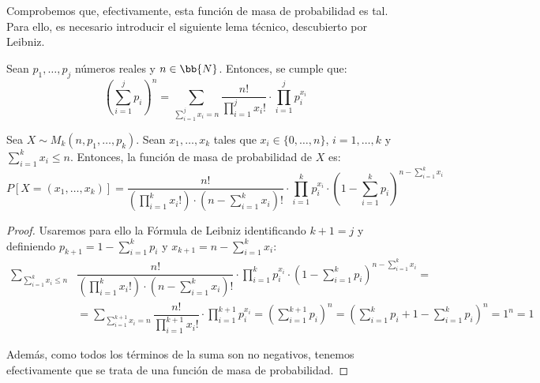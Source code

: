 Comprobemos que, efectivamente, esta función de masa de probabilidad es tal.
Para ello, es necesario introducir el siguiente lema técnico, descubierto por Leibniz.
\begin{lema}
    Sean $p_1, \ldots, p_j$ números reales y $n\in \bb{N}$. Entonces, se cumple que:
    \begin{equation*}
        \left(\sum_{i=1}^j p_i\right)^n=\sum_{\sum\limits_{i=1}^j x_i=n}\dfrac{n!}{\prod\limits_{i=1}^j x_i!}\cdot \prod_{i=1}^j p_i^{x_i}
    \end{equation*}
\end{lema}
\begin{prop}
    Sea $X\sim M_k(n, p_1, \ldots, p_k)$. Sean $x_1, \ldots, x_k$ tales que $x_i\in \{0,\dots,n\}$, $i=1, \ldots, k$ y $\sum\limits_{i=1}^k x_i\leq n$. Entonces, la función de masa de probabilidad de $X$ es:
    \begin{equation*}
        P[X=(x_1,\dots,x_k)]=\dfrac{n!}{\left(\prod\limits_{i=1}^k x_i!\right)\cdot \left(n-\sum\limits_{i=1}^k x_i\right)!}\cdot \prod_{i=1}^{k} p_i^{x_i} \cdot \left(1-\sum\limits_{i=1}^k p_i\right)^{n-\sum\limits_{i=1}^k x_i}
    \end{equation*}
\end{prop}
\begin{proof}
    Usaremos para ello la Fórmula de Leibniz identificando $k+1=j$ y definiendo $p_{k+1}=1-\sum\limits_{i=1}^k p_i$ y $x_{k+1}=n-\sum\limits_{i=1}^k x_i$:
    \begin{align*}
        \sum_{\sum\limits_{i=1}^k x_i\leq n} &\dfrac{n!}{\left(\prod\limits_{i=1}^k x_i!\right)\cdot \left(n-\sum\limits_{i=1}^k x_i\right)!}\cdot \prod_{i=1}^{k} p_i^{x_i} \cdot \left(1-\sum\limits_{i=1}^k p_i\right)^{n-\sum\limits_{i=1}^k x_i}
        =\\&=
        \sum_{\sum\limits_{i=1}^{k+1} x_i=n}\dfrac{n!}{\prod\limits_{i=1}^{k+1} x_i!}\cdot \prod_{i=1}^{k+1} p_i^{x_i}
        = \left(\sum_{i=1}^{k+1} p_i\right)^n = \left(\sum_{i=1}^{k} p_i+1-\sum_{i=1}^{k} p_i\right)^n=1^n=1
    \end{align*}

    Además, como todos los términos de la suma son no negativos, tenemos efectivamente que se trata de una función de masa de probabilidad.
\end{proof}

